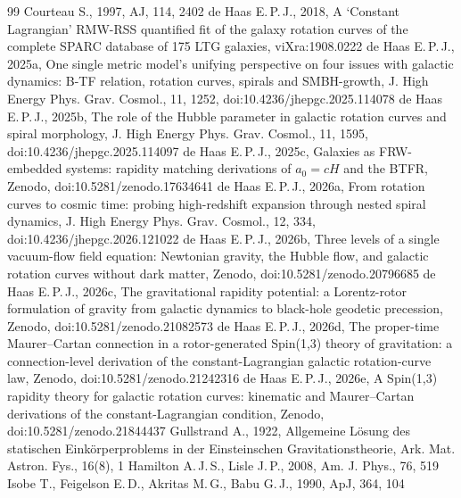 \documentclass[11pt,a4paper]{article}
\begin{document}
\begin{thebibliography}{99}
 Courteau S., 1997, AJ, 114, 2402
 de Haas E.\,P.\,J., 2018, A `Constant Lagrangian' RMW-RSS quantified fit of the galaxy rotation curves of the complete SPARC database of 175 LTG galaxies, viXra:1908.0222
 de Haas E.\,P.\,J., 2025a, One single metric model's unifying perspective on four issues with galactic dynamics: B-TF relation, rotation curves, spirals and SMBH-growth, J. High Energy Phys. Grav. Cosmol., 11, 1252, doi:10.4236/jhepgc.2025.114078
 de Haas E.\,P.\,J., 2025b, The role of the Hubble parameter in galactic rotation curves and spiral morphology, J. High Energy Phys. Grav. Cosmol., 11, 1595, doi:10.4236/jhepgc.2025.114097
 de Haas E.\,P.\,J., 2025c, Galaxies as FRW-embedded systems: rapidity matching derivations of $a_0=cH$ and the BTFR, Zenodo, doi:10.5281/zenodo.17634641
 de Haas E.\,P.\,J., 2026a, From rotation curves to cosmic time: probing high-redshift expansion through nested spiral dynamics, J. High Energy Phys. Grav. Cosmol., 12, 334, doi:10.4236/jhepgc.2026.121022
 de Haas E.\,P.\,J., 2026b, Three levels of a single vacuum-flow field equation: Newtonian gravity, the Hubble flow, and galactic rotation curves without dark matter, Zenodo, doi:10.5281/zenodo.20796685
 de Haas E.\,P.\,J., 2026c, The gravitational rapidity potential: a Lorentz-rotor formulation of gravity from galactic dynamics to black-hole geodetic precession, Zenodo, doi:10.5281/zenodo.21082573
 de Haas E.\,P.\,J., 2026d, The proper-time Maurer--Cartan connection in a rotor-generated Spin(1,3) theory of gravitation: a connection-level derivation of the constant-Lagrangian galactic rotation-curve law, Zenodo, doi:10.5281/zenodo.21242316
 de Haas E.\,P.\,J., 2026e, A Spin(1,3) rapidity theory for galactic rotation curves: kinematic and Maurer--Cartan derivations of the constant-Lagrangian condition, Zenodo, doi:10.5281/zenodo.21844437
 Gullstrand A., 1922, Allgemeine L\"osung des statischen Eink\"orperproblems in der Einsteinschen Gravitationstheorie, Ark. Mat. Astron. Fys., 16(8), 1
 Hamilton A.\,J.\,S., Lisle J.\,P., 2008, Am. J. Phys., 76, 519
 Isobe T., Feigelson E.\,D., Akritas M.\,G., Babu G.\,J., 1990, ApJ, 364, 104

\end{thebibliography}
\end{document}

